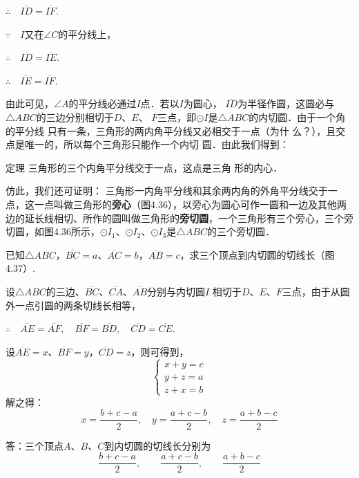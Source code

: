 $\therefore\quad \overline{ID}=\overline{IF}$.

$\because\quad I$又在$\angle C$的平分线上，

$\therefore\quad \overline{ID}=\overline{IE}$.

$\therefore\quad \overline{IE}=\overline{IF}$.

由此可见，$\angle A$的平分线必通过$I$点．若以$I$为圆心，
$\overline{ID}$为半径作圆，这圆必与$\triangle ABC$的三边分别相切于$D$、$E$、
$F$三点，即$\odot I$是$\triangle ABC$的内切圆．由于一个角的平分线
只有一条，三角形的两内角平分线又必相交于一点（为什
么？），且交点是唯一的，所以每个三角形只能作一个内切
圆．由此我们得到：

\begin{blk}
    {定理} 三角形的三个内角平分线交于一点，这点是三角
形的内心．
\end{blk}

  仿此，我们还可证明：
  三角形一内角平分线和其余两内角的外角平分线交于一点，这一点叫做三角形的\textbf{旁心}（图4.36），以旁心为圆心可作一圆和一边及其他两边的延长线相切、所作的圆叫做三角形的\textbf{旁切圆}，一个三角形有三个旁心，三个旁切圆，如图4.36所示，$\odot I_1$、$\odot I_2$、$\odot I_3$是$\triangle ABC$的三个旁切圆．
  
  \begin{example}
  已知$\triangle ABC$，$\overline{BC}=a$、$\overline{AC}=b$，$\overline{AB}=c$，求三个顶点到内切圆的切线长（图4.37）.
  \end{example}
  
  \begin{solution}
    设$\triangle ABC$的三边、$\overline{BC}$、$\overline{CA}$、$\overline{AB}$分别与内切圆$I$
  相切于$D$、$E$、$F$三点，由于从圆外一点引圆的两条切线长相等，
  
  $\therefore\quad \overline{AE}=\overline{AF},\quad \overline{BF}=\overline{BD},\quad \overline{CD}=\overline{CE}$. 
  
  设$\overline{AE}=x$、$\overline{BF}=y$，$\overline{CD}=z$，则可得到，
  \[\begin{cases}
    x+y=c\\
    y+z=a\\
    z+x=b
  \end{cases}\]
  解之得：
  \[x=\frac{b+c-a}{2},\quad y=\frac{a+c-b}{2},\quad z=\frac{a+b-c}{2}\]
  
  答：三个顶点$A$、$B$、$C$到内切圆的切线长分别为
  \[\frac{b+c-a}{2},\qquad \frac{a+c-b}{2},\qquad \frac{a+b-c}{2}\]
  \end{solution}
  
